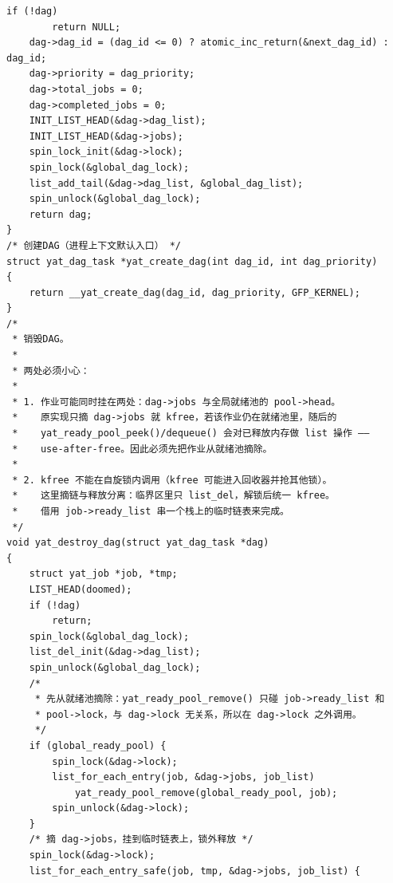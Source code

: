 \documentclass[10pt,a4paper]{article}
\newenvironment{yatpage}{\vspace*{0pt}}{\par}
\begin{document}
\begin{yatpage}
\begin{Verbatim}[fontsize=\fontsize{8.2}{9.8}\selectfont]
    if (!dag)
        return NULL;
    dag->dag_id = (dag_id <= 0) ? atomic_inc_return(&next_dag_id) : dag_id;
    dag->priority = dag_priority;
    dag->total_jobs = 0;
    dag->completed_jobs = 0;
    INIT_LIST_HEAD(&dag->dag_list);
    INIT_LIST_HEAD(&dag->jobs);
    spin_lock_init(&dag->lock);
    spin_lock(&global_dag_lock);
    list_add_tail(&dag->dag_list, &global_dag_list);
    spin_unlock(&global_dag_lock);
    return dag;
}
/* 创建DAG（进程上下文默认入口） */
struct yat_dag_task *yat_create_dag(int dag_id, int dag_priority)
{
    return __yat_create_dag(dag_id, dag_priority, GFP_KERNEL);
}
/*
 * 销毁DAG。
 *
 * 两处必须小心：
 *
 * 1. 作业可能同时挂在两处：dag->jobs 与全局就绪池的 pool->head。
 *    原实现只摘 dag->jobs 就 kfree，若该作业仍在就绪池里，随后的
 *    yat_ready_pool_peek()/dequeue() 会对已释放内存做 list 操作 ——
 *    use-after-free。因此必须先把作业从就绪池摘除。
 *
 * 2. kfree 不能在自旋锁内调用（kfree 可能进入回收器并抢其他锁）。
 *    这里摘链与释放分离：临界区里只 list_del，解锁后统一 kfree。
 *    借用 job->ready_list 串一个栈上的临时链表来完成。
 */
void yat_destroy_dag(struct yat_dag_task *dag)
{
    struct yat_job *job, *tmp;
    LIST_HEAD(doomed);
    if (!dag)
        return;
    spin_lock(&global_dag_lock);
    list_del_init(&dag->dag_list);
    spin_unlock(&global_dag_lock);
    /*
     * 先从就绪池摘除：yat_ready_pool_remove() 只碰 job->ready_list 和
     * pool->lock，与 dag->lock 无关系，所以在 dag->lock 之外调用。
     */
    if (global_ready_pool) {
        spin_lock(&dag->lock);
        list_for_each_entry(job, &dag->jobs, job_list)
            yat_ready_pool_remove(global_ready_pool, job);
        spin_unlock(&dag->lock);
    }
    /* 摘 dag->jobs，挂到临时链表上，锁外释放 */
    spin_lock(&dag->lock);
    list_for_each_entry_safe(job, tmp, &dag->jobs, job_list) {
\end{Verbatim}
\end{yatpage}
\newpage
\end{document}

